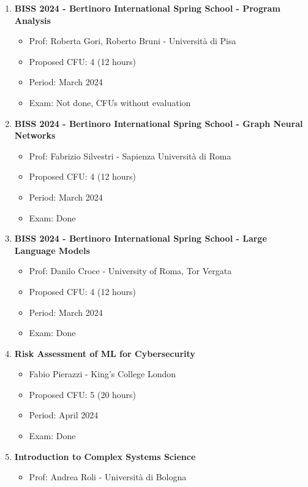\documentclass[runningheads]{llncs}
\begin{document}
\begin{enumerate}
    \item \textbf{BISS 2024 - Bertinoro International Spring School - Program Analysis}
    \begin{itemize}
        \item Prof: Roberta Gori, Roberto Bruni  - Università di Pisa
        \item Proposed CFU: 4 (12 hours) 
        \item Period: March 2024
        \item Exam: Not done, CFUs without evaluation
    \end{itemize}    
    \item \textbf{BISS 2024 - Bertinoro International Spring School - Graph Neural Networks}
    \begin{itemize}
        \item Prof: Fabrizio Silvestri - Sapienza Università di Roma
        \item Proposed CFU: 4 (12 hours) 
        \item Period: March 2024
        \item Exam: Done
    \end{itemize}  
    \item \textbf{BISS 2024 - Bertinoro International Spring School - Large Language Models}
    \begin{itemize}
        \item Prof: Danilo Croce - University of Roma, Tor Vergata
        \item Proposed CFU: 4 (12 hours) 
        \item Period: March 2024
        \item Exam: Done
    \end{itemize}  
    \item \textbf{Risk Assessment of ML for Cybersecurity}
    \begin{itemize}
        \item Fabio Pierazzi - King's College London
        \item Proposed CFU: 5 (20 hours) 
        \item Period: April 2024
        \item Exam: Done
    \end{itemize}    
    \item \textbf{Introduction to Complex Systems Science} 
    \begin{itemize}
        \item Prof: Andrea Roli - Università di Bologna      

\end{itemize}
\end{enumerate}
\end{document}
